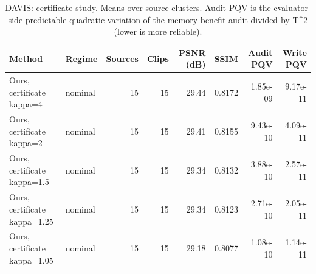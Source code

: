 \begin{table}[t]
\centering
\caption{DAVIS: certificate study. Means over source clusters. Audit PQV is the evaluator-side predictable quadratic variation of the memory-benefit audit divided by T^2 (lower is more reliable).}
\label{tab:certificate_DAVIS}
\small
\begin{tabular}{llrrrrrr}
\toprule
Method & Regime & Sources & Clips & PSNR (dB) & SSIM & Audit PQV & Write PQV \\
\midrule
Ours, certificate kappa=4 & nominal & 15 & 15 & 29.44 & 0.8172 & 1.85e-09 & 9.17e-11 \\
Ours, certificate kappa=2 & nominal & 15 & 15 & 29.41 & 0.8155 & 9.43e-10 & 4.09e-11 \\
Ours, certificate kappa=1.5 & nominal & 15 & 15 & 29.34 & 0.8132 & 3.88e-10 & 2.57e-11 \\
Ours, certificate kappa=1.25 & nominal & 15 & 15 & 29.34 & 0.8123 & 2.71e-10 & 2.05e-11 \\
Ours, certificate kappa=1.05 & nominal & 15 & 15 & 29.18 & 0.8077 & 1.08e-10 & 1.14e-11 \\
\bottomrule
\end{tabular}
\end{table}
